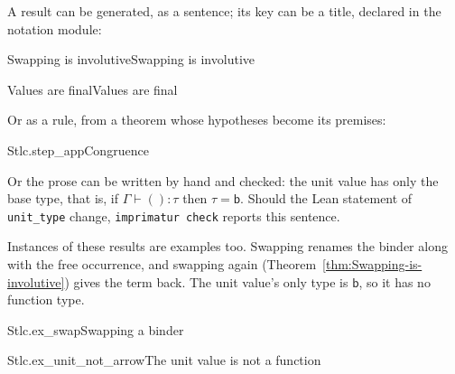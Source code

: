 \documentclass{article}
\newcommand\val{v}
\begin{document}
A result can be generated, as a sentence; its key can be a title, declared
in the notation module:

\begin{leantheorem}[sum=zzIi1wbp85]{Swapping is involutive}{Swapping is involutive}
\label{thm:Swapping-is-involutive}
\end{leantheorem}

\begin{leantheorem}[sum=Llwby7f-kQ]{Values are final}{Values are final}
\label{thm:Values-are-final}
\LeanProse{Let $\val \in \mathit{Val}$ and $e \in \mathit{Term}$. Then $\neg (\val \longrightarrow e)$.}
\end{leantheorem}

Or as a rule, from a theorem whose hypotheses become its premises:
\begin{center}
\begin{leanblock}[view=math, rule, sum=fpyxtM_nmj]{Stlc.step_app}{Congruence}
\end{leanblock}
\end{center}

Or the prose can be written by hand and checked: the unit value has only
the base type, that is, if $\Gamma \vdash () : \tau$ then
$\tau = \mathsf{b}$. Should the Lean statement of
\verb|unit_type| change, \texttt{imprimatur check} reports this sentence.

Instances of these results are examples too. Swapping renames the binder
along with the free occurrence, and swapping again
(Theorem~\ref{thm:Swapping-is-involutive}) gives the term back. The unit
value's only type is $\mathsf{b}$, so it has no function type.

\begin{leanexample}[sum=Kp3J3ralk_]{Stlc.ex_swap}{Swapping a binder}
\label{ex:Stlc.ex_swap}
\end{leanexample}

\begin{leanexample}[sum=vrAVDD3vBM]{Stlc.ex_unit_not_arrow}{The unit value is not a function}
\label{ex:Stlc.ex_unit_not_arrow}
\end{leanexample}
\end{document}
